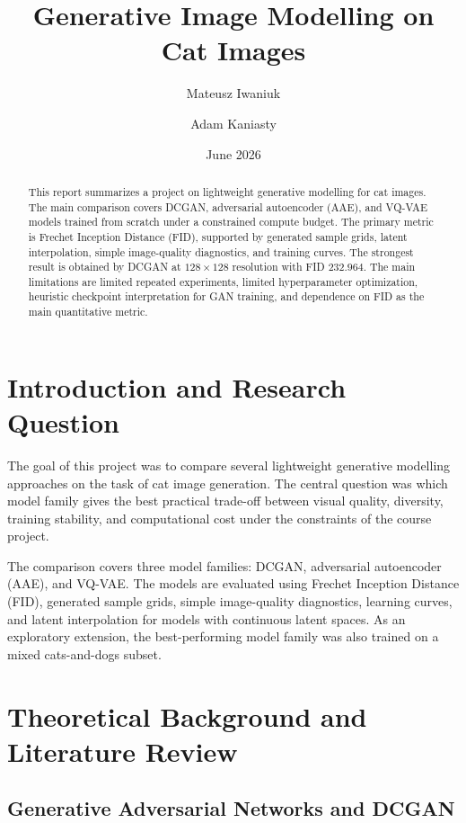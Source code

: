 \documentclass[11pt,a4paper]{article}
\title{Generative Image Modelling on Cat Images}
\author{Mateusz Iwaniuk \and Adam Kaniasty}
\date{June 2026}
\begin{document}
\maketitle

\begin{abstract}
This report summarizes a project on lightweight generative modelling for cat images.
The main comparison covers DCGAN, adversarial autoencoder (AAE), and VQ-VAE models trained from scratch under a constrained compute budget.
The primary metric is Frechet Inception Distance (FID), supported by generated sample grids, latent interpolation, simple image-quality diagnostics, and training curves.
The strongest result is obtained by DCGAN at $128\times128$ resolution with FID $232.964$.
The main limitations are limited repeated experiments, limited hyperparameter optimization, heuristic checkpoint interpretation for GAN training, and dependence on FID as the main quantitative metric.
\end{abstract}

\tableofcontents
\newpage

\section{Introduction and Research Question}

The goal of this project was to compare several lightweight generative modelling approaches on the task of cat image generation. The central question was which model family gives the best practical trade-off between visual quality, diversity, training stability, and computational cost under the constraints of the course project.

The comparison covers three model families: DCGAN, adversarial autoencoder (AAE), and VQ-VAE. The models are evaluated using Frechet Inception Distance (FID), generated sample grids, simple image-quality diagnostics, learning curves, and latent interpolation for models with continuous latent spaces. As an exploratory extension, the best-performing model family was also trained on a mixed cats-and-dogs subset.

\section{Theoretical Background and Literature Review}

\subsection{Generative Adversarial Networks and DCGAN}
\end{document}

